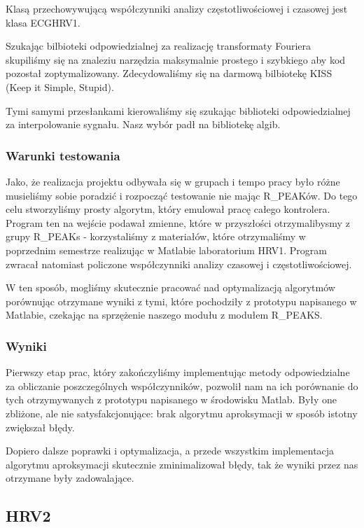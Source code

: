 \documentclass[a4paper, 11pt]{article}
\begin{document}
Klasą przechowywującą współczynniki analizy częstotliwościowej i czasowej jest klasa ECGHRV1.

Szukając bilbioteki odpowiedzialnej za realizację transformaty Fouriera skupiliśmy się na znaleziu narzędzia maksymalnie prostego i szybkiego aby kod pozostał zoptymalizowany. Zdecydowaliśmy się na darmową bilbiotekę KISS (Keep it Simple, Stupid).

Tymi samymi przesłankami kierowaliśmy się szukając biblioteki odpowiedzialnej za interpolowanie sygnału. Nasz wybór padł na bibliotekę algib.

\subsubsection{Warunki testowania}
\label{sec:hrv1:tests}

Jako, że realizacja projektu odbywała się w grupach i tempo pracy było różne musieliśmy sobie poradzić i rozpocząć testowanie nie mając R\_PEAKów. Do tego celu stworzyliśmy prosty algorytm, który emulował pracę całego kontrolera. Program ten na wejście podawał zmienne, które w przyszłości otrzymalibysmy z grupy R\_PEAKs - korzystaliśmy z materiałów, które otrzymaliśmy w poprzednim semestrze realizując w Matlabie laboratorium HRV1. Program zwracał natomiast policzone współczynniki analizy czasowej i częstotliwościowej.

W ten sposób, mogliśmy skutecznie pracować nad optymalizacją algorytmów porównując otrzymane wyniki z tymi, które pochodziły z prototypu napisanego w Matlabie, czekając na sprzężenie naszego modułu z modułem R\_PEAKS.

\subsubsection{Wyniki}
\label{sec:hrv1:results}
Pierwszy etap prac, który zakończyliśmy implementując metody odpowiedzialne za obliczanie poszczególnych współczynników, pozwolił nam na ich porównanie do tych otrzymywanych z prototypu napisanego w środowisku Matlab. Były one zbliżone, ale nie satysfakcjonujące: brak algorytmu aproksymacji w sposób istotny zwiększał błędy.

Dopiero dalsze poprawki i optymalizacja, a przede wszystkim implementacja algorytmu aproksymacji skutecznie zminimalizował błędy, tak że wyniki przez nas otrzymane były zadowalające.


\subsection{HRV2}
\label{sec:hrv2}
\end{document}
